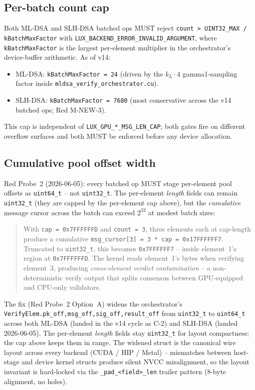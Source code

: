 \subsection{Per-batch count cap}

Both ML-DSA and SLH-DSA batched ops MUST reject
\texttt{count > UINT32\_MAX / kBatchMaxFactor} with
\texttt{LUX\_BACKEND\_ERROR\_INVALID\_ARGUMENT}, where
\texttt{kBatchMaxFactor} is the largest per-element multiplier in
the orchestrator's device-buffer arithmetic. As of v14:

\begin{itemize}[leftmargin=2em,nosep]
\item ML-DSA: \texttt{kBatchMaxFactor = 24} (driven by the
  $k_L \cdot 4$ gamma1-sampling factor inside
  \texttt{mldsa\_verify\_orchestrator.cu}).
\item SLH-DSA: \texttt{kBatchMaxFactor = 7680} (most conservative
  across the v14 batched ops; Red M-NEW-3).
\end{itemize}

This cap is independent of \texttt{LUX\_GPU\_*\_MSG\_LEN\_CAP};
both gates fire on different overflow surfaces and both MUST be
enforced before any device allocation.

\subsection{Cumulative pool offset width}

Red Probe~2 (2026-06-05): every batched op MUST stage per-element
pool offsets as \texttt{uint64\_t} -- not \texttt{uint32\_t}. The
per-element \emph{length} fields can remain \texttt{uint32\_t}
(they are capped by the per-element cap above), but the
\emph{cumulative} message cursor across the batch can exceed
$2^{32}$ at modest batch sizes:

\begin{quote}
With \texttt{cap = 0x7FFFFFFD} and \texttt{count = 3}, three
elements each at cap-length produce a cumulative
\texttt{msg\_cursor[3] = 3 * cap = 0x17FFFFFF7}. Truncated to
\texttt{uint32\_t}, this becomes \texttt{0x7FFFFFF7} -- inside
element~1's region at \texttt{0x7FFFFFFD}. The kernel reads
element~1's bytes when verifying element~3, producing
\emph{cross-element verdict contamination} -- a non-deterministic
verify output that splits consensus between GPU-equipped and
CPU-only validators.
\end{quote}

The fix (Red Probe~2 Option~A) widens the orchestrator's
\texttt{VerifyElem.{pk\_off,msg\_off,sig\_off,result\_off}} from
\texttt{uint32\_t} to \texttt{uint64\_t} across both ML-DSA (landed
in the v14 cycle as C-2) and SLH-DSA (landed 2026-06-05). The
per-element \emph{length} fields stay \texttt{uint32\_t} for layout
compactness; the cap above keeps them in range. The widened
struct is the canonical wire layout across every backend
(CUDA / HIP / Metal) -- mismatches between host-stage and device
kernel structs produce silent NVCC misalignment, so the layout
invariant is hard-locked via the \texttt{\_pad\_<field>\_len}
trailer pattern (8-byte alignment, no holes).

